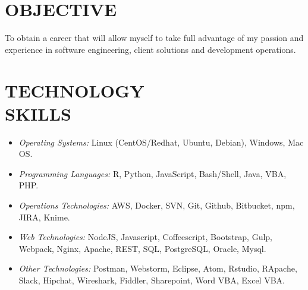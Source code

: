 \documentclass[margin, 10pt]{res} %
\begin{document}
\begin{resume}

 
\section{OBJECTIVE}  

To obtain a career that will allow myself to take full advantage of my passion and experience in software engineering, client solutions and development operations. 


\section{TECHNOLOGY \\ SKILLS} 
\begin{itemize}[leftmargin=*, label={}, noitemsep, labelindent=-5pt,itemindent=-10pt] 
\item {\sl Operating Systems:} Linux (CentOS/Redhat, Ubuntu, Debian), Windows, Mac OS. 
\item {\sl Programming Languages:} R, Python, JavaScript, Bash/Shell, Java, VBA, PHP. 
\item {\sl Operations Technologies:} AWS, Docker, SVN, Git, Github, Bitbucket, npm, JIRA, Knime. 
\item {\sl Web Technologies:} NodeJS, Javascript, Coffeescript, Bootstrap, Gulp, Webpack, Nginx, Apache, REST, SQL, PostgreSQL, Oracle, Mysql. 
\item {\sl Other Technologies:} Postman, Webstorm, Eclipse, Atom, Rstudio, RApache, Slack, Hipchat, Wireshark, Fiddler, Sharepoint, Word VBA, Excel VBA. 
\end{itemize}



\end{resume}
\end{document}
